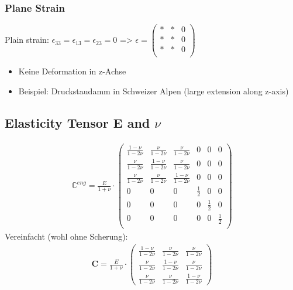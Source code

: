 	\subsubsection{Plane Strain}
	Plain strain: $\epsilon_{33} = \epsilon_{13} = \epsilon_{23}= 0$ => $\epsilon =
	\begin{pmatrix}
	* & * & 0\\
	* & * & 0\\
	* & * & 0\\
	\end{pmatrix} $\\
	\begin{itemize}
		\item Keine Deformation in z-Achse
		\item Beispiel: Druckstaudamm in Schweizer Alpen (large extension along
		z-axis)
	\end{itemize}
	
	\subsection{Elasticity Tensor E and $\nu$}
	\begin{align}
		\mathbb{C}^{eng} = \frac{E}{1 + \nu} \cdot \begin{pmatrix}
			\frac{1-\nu}{1-2\nu} & \frac{\nu}{1-2\nu} & \frac{\nu}{1-2\nu} & 0 & 0 & 0\\
			\frac{\nu}{1-2\nu} & \frac{1-\nu}{1-2\nu} & \frac{\nu}{1-2\nu} & 0 & 0 & 0\\
			\frac{\nu}{1-2\nu} & \frac{\nu}{1-2\nu} & \frac{1-\nu}{1-2\nu} & 0 & 0 & 0\\
			0 & 0 & 0 & \frac{1}{2} & 0 & 0\\
			0 & 0 & 0 & 0 & \frac{1}{2} & 0\\
			0 & 0 & 0 & 0 & 0 & \frac{1}{2}\\
		\end{pmatrix}
	\end{align}
	Vereinfacht (wohl ohne Scherung):
	\begin{align}\label{eq:elasticity}
		\mathbf{C} = \frac{E}{1 + \nu} \cdot \begin{pmatrix}
			\frac{1-\nu}{1-2\nu} & \frac{\nu}{1-2\nu} & \frac{\nu}{1-2\nu}\\
			\frac{\nu}{1-2\nu} & \frac{1-\nu}{1-2\nu} & \frac{\nu}{1-2\nu}\\
			\frac{\nu}{1-2\nu} & \frac{\nu}{1-2\nu} & \frac{1-\nu}{1-2\nu}
		\end{pmatrix}
	\end{align}
	
